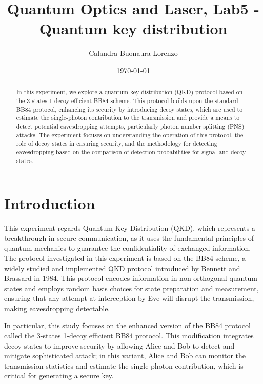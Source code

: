\documentclass[prl,twocolumn]{revtex4-1}
\begin{document}
\title{Quantum Optics and Laser, Lab5 - Quantum key distribution}


\author{Calandra Buonaura Lorenzo}

\date{\today}


\begin{abstract}
In this experiment, we explore a quantum key distribution (QKD) protocol based on the 3-states 1-decoy efficient BB84 scheme. This protocol builds upon the standard BB84 protocol, enhancing its security by introducing decoy states, which are used to estimate the single-photon contribution to the transmission and provide a means to detect potential eavesdropping attempts, particularly photon number splitting (PNS) attacks. The experiment focuses on understanding the operation of this protocol, the role of decoy states in ensuring security, and the methodology for detecting eavesdropping based on the comparison of detection probabilities for signal and decoy states.

\end{abstract}

\maketitle

\section{Introduction}
\label{sec:intro}
This experiment regards Quantum Key Distribution (QKD), which represents a breakthrough in secure communication, as it uses the fundamental principles of quantum mechanics to guarantee the confidentiality of exchanged information. The protocol investigated in this experiment is based on the BB84 scheme, a widely studied and implemented QKD protocol introduced by Bennett and Brassard in 1984. This protocol encodes information in non-orthogonal quantum states and employs random basis choices for state preparation and measurement, ensuring that any attempt at interception by Eve will disrupt the transmission, making eavesdropping detectable.

In particular, this study focuses on the enhanced version of the BB84 protocol called the 3-states 1-decoy efficient BB84 protocol. This modification integrates decoy states to improve security by allowing Alice and Bob to detect and mitigate sophisticated attack; in this variant, Alice and Bob can monitor the transmission statistics and estimate the single-photon contribution, which is critical for generating a secure key.
\end{document}
